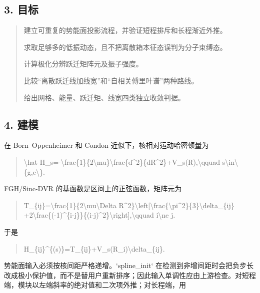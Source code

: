 \documentclass[UTF8,openany,11pt,fontset=fandol]{ctexbook}
\begin{document}
\subsection{\texorpdfstring{\textbf{3.
目标}}{3. 目标}}\label{ux76eeux6807}

\begin{quote}
建立可重复的势能面投影流程，并验证短程排斥和长程渐近外推。

求取足够多的低振动态，且不把离散箱本征态误判为分子束缚态。

计算极化分辨跃迁矩阵元及振子强度。

比较``离散跃迁线加线宽''和``自相关傅里叶谱''两种路线。

给出网格、能量、跃迁矩、线宽四类独立收敛判据。
\end{quote}

\subsection{\texorpdfstring{\textbf{4.
建模}}{4. 建模}}\label{ux5efaux6a21}

在 Born--Oppenheimer 和 Condon 近似下，核相对运动哈密顿量为

\begin{quote}
\textbackslash hat
H\_s=-\textbackslash frac\{1\}\{2\textbackslash mu\}\textbackslash frac\{d\^{}2\}\{dR\^{}2\}+V\_s(R),\textbackslash qquad
s\textbackslash in\textbackslash\{g,e\textbackslash\}.
\end{quote}

FGH/Sinc-DVR 的基函数是区间上的正弦函数，矩阵元为

\begin{quote}
T\_\{ij\}=\textbackslash frac\{1\}\{2\textbackslash mu\textbackslash Delta
R\^{}2\}\textbackslash left{[}\textbackslash frac\{\textbackslash pi\^{}2\}\{3\}\textbackslash delta\_\{ij\}
+2\textbackslash frac\{(-1)\^{}\{i-j\}\}\{(i-j)\^{}2\}\textbackslash right{]},\textbackslash qquad
i\textbackslash ne j.
\end{quote}

于是

\begin{quote}
H\_\{ij\}\^{}\{(s)\}=T\_\{ij\}+V\_s(R\_i)\textbackslash delta\_\{ij\}.
\end{quote}

势能面输入必须按核间距严格递增。`spline\_init`
在检测到非增间距时会把负步长改成极小保护值，而不是替用户重新排序；因此输入单调性应由上游检查。对短程端，模块以左端斜率的绝对值和二次项外推；对长程端，用
\end{document}

